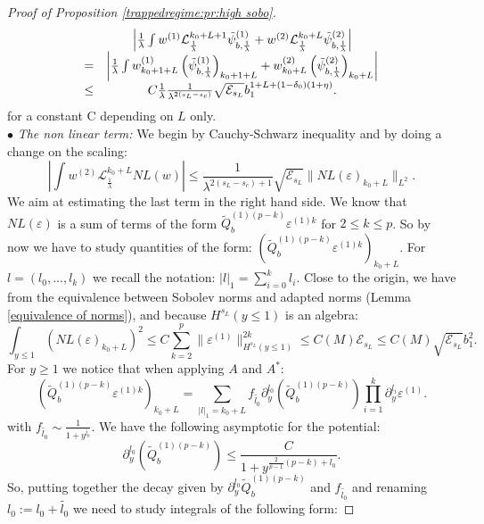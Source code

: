 \documentclass[11pt,a4paper,reqno]{amsart}
\theoremstyle{remark}
\numberwithin{equation}{section}
\begin{document}
\begin{proof}[Proof of Proposition \ref{trappedregime:pr:high sobo}]
\begin{equation} \label{thetrapped:highsobo:eq:estimation psib}
\begin{array}{r c l}
& \left|\frac{1}{\lambda}\int w^{(1)} \mathcal{L}_{\frac{1}{\lambda}}^{k_0+L+1}\tilde{\psi}_{b,\frac{1}{\lambda}}^{(1)}+w^{(2)} \mathcal{L}_{\frac{1}{\lambda}}^{k_0+L}\tilde{\psi}_{b,\frac{1}{\lambda}}^{(2)}\right| \\
=& \left|\frac{1}{\lambda}\int w^{(1)}_{k_0+1+L} \left(\tilde{\psi}_{b,\frac{1}{\lambda}}^{(1)}\right)_{k_0+1+L}+w^{(2)}_{k_0+L} \left( \tilde{\psi}_{b,\frac{1}{\lambda}}^{(2)}\right)_{k_0+L}\right| \\
\leq & C\frac{1}{\lambda} \frac{1}{\lambda^{2(s_L-s_c)}} \sqrt{\mathcal{E}_{s_L}} b_1^{1+L+(1-\delta_0)(1+\eta)} .
\end{array}
\end{equation}
for a constant C depending on $L$ only.\\
$\bullet$ \emph{The non linear term:} We begin by Cauchy-Schwarz inequality and by doing a change on the scaling:
$$
\left|\int w^{(2)}\mathcal{L}_{\frac{1}{\lambda}}^{k_0+L}NL(w)\right| \leq \frac{1}{\lambda^{2(s_L-s_c)+1}}\sqrt{\mathcal{E}_{s_L}}\parallel NL(\varepsilon)_{k_0+L}\parallel_{L^2} .
$$
We aim at estimating the last term in the right hand side. We know that $NL(\varepsilon)$ is a sum of terms of the form $\tilde{Q}_b^{(1)(p-k)}\varepsilon^{(1)k}$ for $2\leq k \leq p$. So by now we have to study quantities of the form: $(\tilde{Q}_b^{(1)(p-k)}\varepsilon^{(1)k})_{k_0+L}$. For $l=(l_0,...,l_k)$ we recall the notation: $|l|_1=\sum_{i=0}^k l_i$. Close to the origin, we have from the equivalence between Sobolev norms and adapted norms (Lemma \ref{equivalence of norms}), and because $H^{s_L}(y\leq 1)$ is an algebra:
$$
\int_{y\leq 1} \left(NL(\varepsilon)_{k_0+L} \right)^2\leq C \sum_{k=2}^p\parallel \varepsilon^{(1)} \parallel^{2k}_{H^{s_L}(y\leq 1)} \leq C(M) \mathcal{E}_{s_L}\leq C(M) \sqrt{\mathcal{E}_{s_L}}b_1^2 .
$$
For $y\geq 1$ we notice that when applying $A$ and $A^*$:
$$
(\tilde{Q}_b^{(1)(p-k)}\varepsilon^{(1)k})_{k_0+L}=\sum_{|l|_1=k_0+L} f_{\tilde{l_0}}\partial_y^{l_0}(\tilde{Q}_b^{(1)(p-k)})\prod_{i=1}^k \partial_y^{l_i} \varepsilon^{(1)} .
$$
with $f_{\tilde{l_0}}\sim \frac{1}{1+y^{\tilde{l_0}}}$. We have the following asymptotic for the potential: 
$$
\partial_y^{l_0}(\tilde{Q}_b^{(1)(p-k)})\leq \frac{C}{1+y^{\frac{2}{p-1}(p-k)+l_0}} .
$$
So, putting together the decay given by $\partial_y^{l_0}\tilde{Q}_b^{(1)(p-k)}$ and $f_{\tilde{l_0}}$ and renaming $l_0:=l_0+\tilde{l_0}$ we need to study integrals of the following form:

\end{proof}
\end{document}
